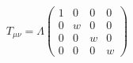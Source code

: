 \begin{equation}
T_{\mu\nu} = \Lambda 
\left( 
\begin{array}{cccc}
1 & 0 & 0 & 0 \\
0 & w & 0 & 0 \\
0 & 0 & w & 0 \\
0 & 0 & 0 & w 
\end{array}
\right)
\label{restframe}
\end{equation}


